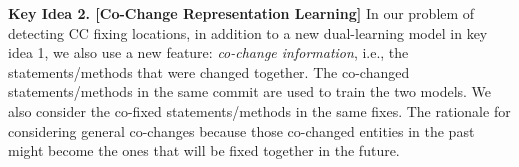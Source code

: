 





{\bf Key Idea 2. [Co-Change Representation Learning]} In our problem
of detecting CC fixing locations, in addition to a new dual-learning
model in key idea 1, we also use a new feature: {\em co-change
  information}, i.e., the statements/methods that were changed
together. The co-changed statements/methods in the same commit are
used to train the two models. We also consider the co-fixed
statements/methods in the same fixes. The rationale for considering
general co-changes because those co-changed entities in the past might
become the ones that will be fixed together in the future.



